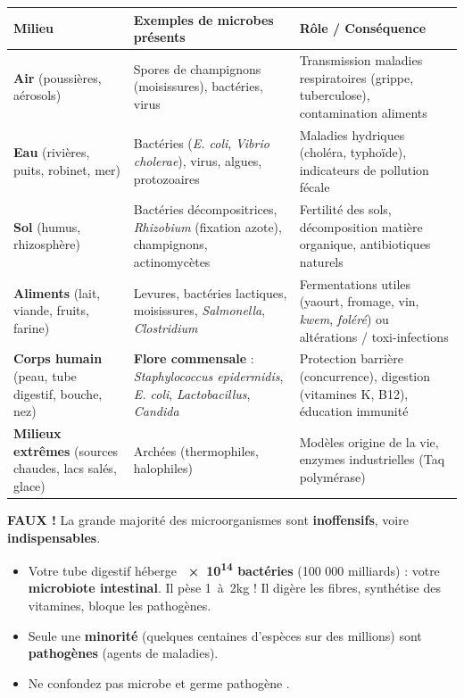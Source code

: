 \documentclass[11pt]{article}
\begin{document}
\begin{center}
\begin{tabularx}{\linewidth}{|l|X|X|}
\hline
\rowcolor{popblueL}
\textbf{Milieu} & \textbf{Exemples de microbes présents} & \textbf{Rôle / Conséquence} \\
\hline
\textbf{Air} (poussières, aérosols) & Spores de champignons (moisissures), bactéries, virus & Transmission maladies respiratoires (grippe, tuberculose), contamination aliments \\
\hline
\textbf{Eau} (rivières, puits, robinet, mer) & Bactéries (\emph{E. coli}, \emph{Vibrio cholerae}), virus, algues, protozoaires & Maladies hydriques (choléra, typhoïde), indicateurs de pollution fécale \\
\hline
\textbf{Sol} (humus, rhizosphère) & Bactéries décompositrices, \emph{Rhizobium} (fixation azote), champignons, actinomycètes & Fertilité des sols, décomposition matière organique, antibiotiques naturels \\
\hline
\textbf{Aliments} (lait, viande, fruits, farine) & Levures, bactéries lactiques, moisissures, \emph{Salmonella}, \emph{Clostridium} & Fermentations utiles (yaourt, fromage, vin, \emph{kwem}, \emph{foléré}) ou altérations / toxi-infections \\
\hline
\textbf{Corps humain} (peau, tube digestif, bouche, nez) & \textbf{Flore commensale} : \emph{Staphylococcus epidermidis}, \emph{E. coli}, \emph{Lactobacillus}, \emph{Candida} & Protection barrière (concurrence), digestion (vitamines K, B12), éducation immunité \\
\hline
\textbf{Milieux extrêmes} (sources chaudes, lacs salés, glace) & Archées (thermophiles, halophiles) & Modèles origine de la vie, enzymes industrielles (Taq polymérase) \\
\hline
\end{tabularx}
\end{center}

\begin{attention}[Piège fréquent : « Microbe = Maladie »]
\textbf{FAUX !} La grande majorité des microorganismes sont \textbf{inoffensifs}, voire \textbf{indispensables}.
\begin{itemize}
    \item Votre tube digestif héberge \textbf{\num{e14} bactéries} (100 000 milliards) : votre \textbf{microbiote intestinal}. Il pèse \SI{1}{à 2}{kg} ! Il digère les fibres, synthétise des vitamines, bloque les pathogènes.
    \item Seule une \textbf{minorité} (quelques centaines d'espèces sur des millions) sont \textbf{pathogènes} (agents de maladies).
    \item Ne confondez pas \og microbe \fg et \og germe pathogène \fg.
\end{itemize}
\end{attention}
\end{document}
